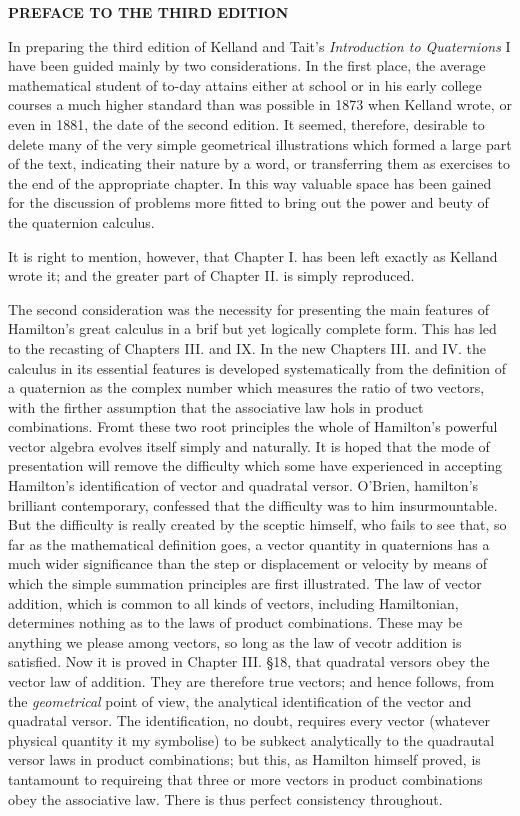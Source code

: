 \documentclass{article}
\begin{document}
\begin{center}
{\large\textbf{PREFACE TO THE THIRD EDITION}}
\end{center}
\bigskip
In preparing the third edition of Kelland and Tait's \textit{Introduction to Quaternions} I have been guided mainly by two considerations. In the first place, the average mathematical student of to-day attains either at school or in his early college courses a much higher standard than was possible in 1873 when Kelland wrote, or even in 1881, the date of the second edition. It seemed, therefore, desirable to delete many of the very simple geometrical illustrations which formed a large part of the text, indicating their nature by a word, or transferring them as exercises to the end of the appropriate chapter. In this way valuable space has been gained for the discussion of problems more fitted to bring out the power and beuty of the quaternion calculus.

It is right to mention, however, that Chapter I. has been left exactly as Kelland wrote it; and the greater part of Chapter II. is simply reproduced.

The second consideration was the necessity for presenting the main features of Hamilton's great calculus in a brif but yet logically complete form. This has led to the recasting of Chapters III. and IX. In the new Chapters III. and IV. the calculus in its essential features is developed systematically from the definition of a quaternion as the complex number which measures the ratio of two vectors, with the firther assumption that the associative law hols in product combinations. Fromt these two root principles the whole of Hamilton's powerful vector algebra evolves itself simply and naturally. It is hoped that the mode of presentation will remove the difficulty which some have experienced in accepting Hamilton's identification of vector and quadratal versor. O'Brien, hamilton's brilliant contemporary, confessed that the difficulty was to him insurmountable. But the difficulty is really created by the sceptic himself, who fails to see that, so far as the mathematical definition goes, a vector quantity in quaternions has a much wider significance than the step or displacement or velocity by means of which the simple summation principles are first illustrated. The law of vector addition, which is common to all kinds of vectors, including Hamiltonian, determines nothing as to the laws of product combinations. These may be anything we please among vectors, so long as the law of vecotr addition is satisfied. Now it is proved in Chapter III. \S 18, that quadratal versors obey the vector law of addition. They are therefore true vectors; and hence follows, from the \textit{geometrical} point of view, the analytical identification of the vector and quadratal versor. The identification, no doubt, requires every vector (whatever physical quantity it my symbolise) to be subkect analytically to the quadrautal versor laws in product combinations; but this, as Hamilton himself proved, is tantamount to requireing that three or more vectors in product combinations obey the associative law. There is thus perfect consistency throughout.
\end{document}
